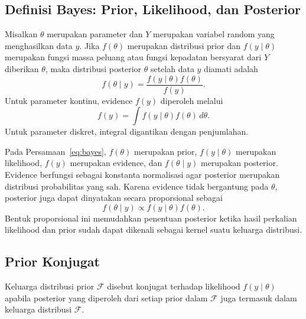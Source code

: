 \subsection{Definisi Bayes: Prior, Likelihood, dan Posterior}
\label{subsec:definisibayes}

\begin{definisi}
\label{def:bayes}
Misalkan $\theta$ merupakan parameter dan $Y$ merupakan variabel random
yang menghasilkan data $y$. Jika $f(\theta)$ merupakan distribusi prior
dan $f(y\mid\theta)$ merupakan fungsi massa peluang atau fungsi kepadatan
bersyarat dari $Y$ diberikan $\theta$, maka distribusi posterior
$\theta$ setelah data $y$ diamati adalah
\begin{equation}
f(\theta\mid y)
=
\frac{f(y\mid\theta)f(\theta)}{f(y)}.
\label{eq:bayes}
\end{equation}
Untuk parameter kontinu, evidence $f(y)$ diperoleh melalui
\begin{equation}
f(y)
=
\int f(y\mid\theta)f(\theta)\,d\theta.
\label{eq:evidencekontinu}
\end{equation}
Untuk parameter diskret, integral digantikan dengan penjumlahan.
\end{definisi}

Pada Persamaan~\eqref{eq:bayes}, $f(\theta)$ merupakan prior,
$f(y\mid\theta)$ merupakan likelihood, $f(y)$ merupakan evidence,
dan $f(\theta\mid y)$ merupakan posterior. Evidence berfungsi sebagai
konstanta normalisasi agar posterior merupakan distribusi probabilitas
yang sah. Karena evidence tidak bergantung pada $\theta$, posterior
juga dapat dinyatakan secara proporsional sebagai
\begin{equation}
f(\theta\mid y)
\propto f(y\mid\theta)f(\theta).
\label{eq:bayesproporsional}
\end{equation}
Bentuk proporsional ini memudahkan penentuan posterior ketika hasil
perkalian likelihood dan prior sudah dapat dikenali sebagai kernel
suatu keluarga distribusi.


\subsection{Prior Konjugat}
\label{subsec:priorkonjugat}

\begin{definisi}
\label{def:priorkonjugat}
Keluarga distribusi prior $\mathcal{F}$ disebut konjugat terhadap
likelihood $f(y\mid\theta)$ apabila posterior yang diperoleh dari
setiap prior dalam $\mathcal{F}$ juga termasuk dalam keluarga
distribusi $\mathcal{F}$.
\end{definisi}

